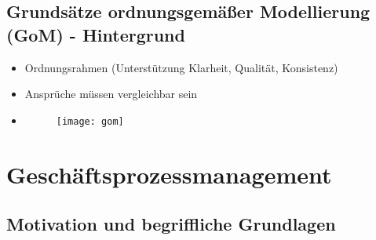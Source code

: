 \subsection{Grundsätze ordnungsgemäßer Modellierung (GoM) - Hintergrund}
\begin{itemize}
	
	\item Ordnungsrahmen (Unterstützung Klarheit, Qualität, Konsistenz)
	\item Ansprüche müssen vergleichbar sein
	\item[] 
	\begin{figure}[H]
	\centering
	\texttt{[image: gom]}
	\end{figure}	
	
	
\end{itemize}

\section{Geschäftsprozessmanagement}
\subsection{Motivation und begriffliche Grundlagen}

